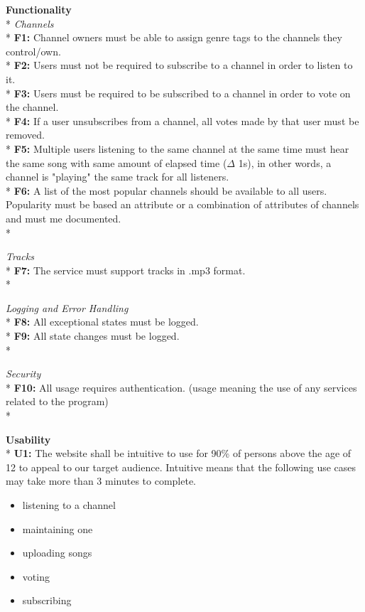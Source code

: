 \documentclass[a4paper,11pt,report]{article}
\begin{document}
{\textbf{Functionality} \\*
\textit{Channels} \\*
\textbf{F1:} Channel owners must be able to assign genre tags to the channels they control/own. \\*
\textbf{F2:} Users must not be required to subscribe to a channel in order to listen to it. \\*
\textbf{F3:} Users must be required to be subscribed to a channel in order to vote on the channel. \\*
\textbf{F4:} If a user unsubscribes from a channel, all votes made by that user must be removed.\\*
\textbf{F5:} Multiple users listening to the same channel at the same time must hear the same song with same amount of elapsed time (\(\Delta\) 1s), in other words, a channel is "playing" the same track for all listeners. \\*
\textbf{F6:} A list of the most popular channels should be available to all users. Popularity must be based an attribute or a combination of attributes of channels and must me documented. \\*

\textit{Tracks} \\*
\textbf{F7:} The service must support tracks in .mp3 format. \\*

\textit{Logging and Error Handling} \\*
\textbf{F8:} All exceptional states must be logged.\\*
\textbf{F9:} All state changes must be logged.\\*

\textit{Security} \\*
\textbf{F10:} All usage requires authentication. (usage meaning the use of any services related to the program)\\*

\textbf{Usability} \\*
\textbf{U1:} The website shall be intuitive to use for 90\% of persons above the age of 12 to appeal to our target audience. Intuitive means that the following use cases may take more than 3 minutes to complete.
\begin{itemize}
\item listening to a channel
\item maintaining one 
\item uploading songs
\item voting
\item subscribing
\end{itemize}

}
\end{document}
